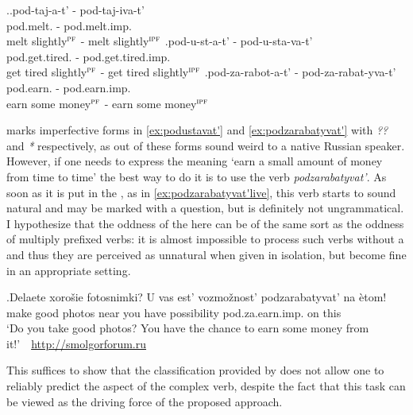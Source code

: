 \ex.\label{ex:pod}\ag.pod-taj-a-t' - pod-taj-iva-t'\\
pod.melt. - pod.melt.imp.\\
melt slightly$^{\textsc{pf}}$ - melt slightly$^{\textsc{ipf}}$
\bg.\label{ex:podustavat'}pod-u-st-a-t' - pod-u-sta-va-t'\\
pod.get.tired. - pod.get.tired.imp.\\
get tired slightly$^{\textsc{pf}}$ - get tired slightly$^{\textsc{ipf}}$
\bg.\label{ex:podzarabatyvat'}pod-za-rabot-a-t' - pod-za-rabat-yva-t'\\
pod.earn. - pod.earn.imp.\\
earn some money$^{\textsc{pf}}$ - earn some money$^{\textsc{ipf}}$

\cite{Kagan:book} marks imperfective forms in \ref{ex:podustavat'} and \ref{ex:podzarabatyvat'} with \textit{??} and \textit{*} respectively, as out of  these forms sound weird to a native Russian speaker. However, if one needs to express the meaning `earn a small amount of money from time to time' the best way to do it is to use the verb \textit{podzarabatyvat'}. As soon as it is put in the , as in \ref{ex:podzarabatyvat'live}, this verb starts to sound natural and may be marked with a question, but is definitely not ungrammatical. I hypothesize that the oddness of the  here can be of the same sort as the oddness of multiply prefixed verbs: it is almost impossible to process such verbs without a  and thus they are perceived as unnatural when given in isolation, but become fine in an appropriate setting.

\exg.\label{ex:podzarabatyvat'live}Delaete xoro\v{s}ie fotosnimki? U vas est' vozmo\v{z}nost' podzarabatyvat' na \`{e}tom!\\
make good photos near you have possibility pod.za.earn.imp. on this\\
\trans `Do you take good photos? You have the chance to earn some money from it!'~~\hbox{}\hfill\hbox{\url{http://smolgorforum.ru}}

This suffices to show that the classification provided by \citet{Tatevosov:07} does not allow one to reliably predict the aspect of the complex verb, despite the fact that this task can be viewed as the driving force of the proposed approach. 

